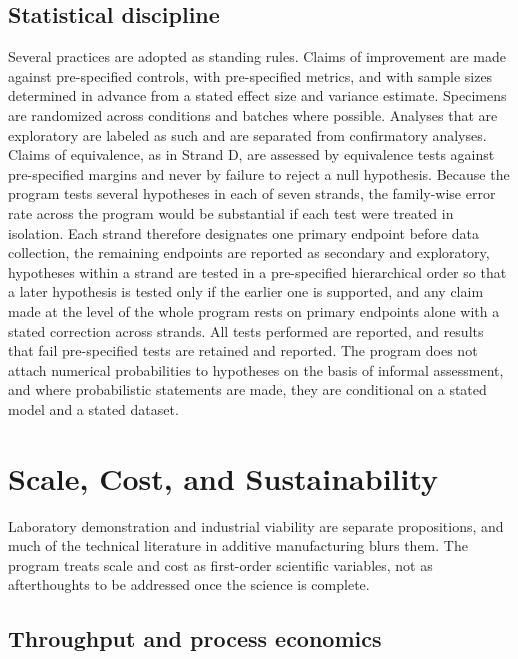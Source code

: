 \documentclass[11pt]{article}
\theoremstyle{definition}
\begin{document}
\subsection{Statistical discipline}

Several practices are adopted as standing rules. Claims of improvement are made against pre-specified controls, with pre-specified metrics, and with sample sizes determined in advance from a stated effect size and variance estimate. Specimens are randomized across conditions and batches where possible. Analyses that are exploratory are labeled as such and are separated from confirmatory analyses. Claims of equivalence, as in Strand D, are assessed by equivalence tests against pre-specified margins and never by failure to reject a null hypothesis. Because the program tests several hypotheses in each of seven strands, the family-wise error rate across the program would be substantial if each test were treated in isolation. Each strand therefore designates one primary endpoint before data collection, the remaining endpoints are reported as secondary and exploratory, hypotheses within a strand are tested in a pre-specified hierarchical order so that a later hypothesis is tested only if the earlier one is supported, and any claim made at the level of the whole program rests on primary endpoints alone with a stated correction across strands. All tests performed are reported, and results that fail pre-specified tests are retained and reported. The program does not attach numerical probabilities to hypotheses on the basis of informal assessment, and where probabilistic statements are made, they are conditional on a stated model and a stated dataset.

\section{Scale, Cost, and Sustainability}

Laboratory demonstration and industrial viability are separate propositions, and much of the technical literature in additive manufacturing blurs them. The program treats scale and cost as first-order scientific variables, not as afterthoughts to be addressed once the science is complete.

\subsection{Throughput and process economics}
\end{document}
